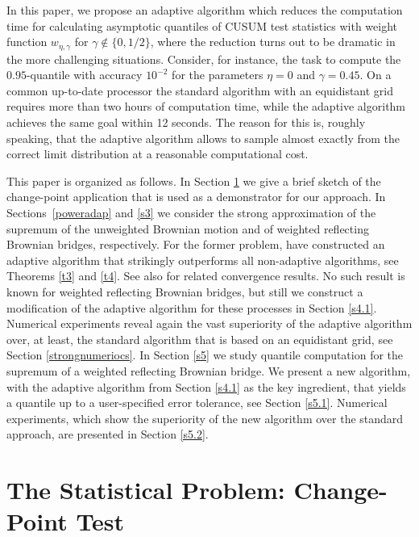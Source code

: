 \documentclass[a4paper]{amsart}
\theoremstyle{definition}
\theoremstyle{plain}
\begin{document}
In this paper, we propose an adaptive algorithm which
reduces the computation time for calculating asymptotic quantiles of
CUSUM test statistics with weight function $w_{\eta,\gamma}$ for
$\gamma \not\in \{0,1/2\}$, where the reduction turns out to be
dramatic in the more challenging situations.
Consider, for instance, the task to compute the
$0.95$-quantile with accuracy $10^{-2}$ for the parameters
$\eta=0$ and $\gamma = 0.45$. On a common up-to-date processor
the standard algorithm with an equidistant grid requires more than
two hours of computation time, while
the adaptive algorithm achieves the same goal within 12 seconds.
The reason for this is, roughly speaking, that
the adaptive algorithm allows
to sample almost exactly from the correct limit distribution
at a reasonable computational cost.

This paper is organized as follows.
In Section \ref{sec:CPT} we give a brief sketch of the change-point
application that is used as a demonstrator for our approach.
In Sections~\ref{poweradap} and \ref{s3} we consider
the strong approximation of the supremum of the
unweighted Brownian motion and of weighted reflecting
Brownian bridges, respectively.
For the former problem, \citet*{MR3605752} have constructed an adaptive
algorithm that strikingly outperforms all non-adaptive algorithms,
see Theorems \ref{t3} and \ref{t4}.
See also \citet*{Calvin1997,Calvin2001,Calvin2004} for related
convergence results.
No such result is known for weighted reflecting
Brownian bridges, but still we construct a
modification of the adaptive algorithm
for these processes in Section \ref{s4.1}. Numerical experiments reveal
again the vast superiority of the adaptive algorithm over, at least, the
standard algorithm that is based on an equidistant
grid, see Section \ref{strongnumeriocs}.
In Section \ref{s5} we study quantile computation
for the supremum of a weighted reflecting
Brownian bridge. We present a new algorithm, with
the adaptive algorithm from Section \ref{s4.1} as the key
ingredient, that yields a quantile up to a user-specified error tolerance,
see Section \ref{s5.1}. Numerical experiments, which show
the superiority of the new algorithm over the standard
approach, are presented in Section \ref{s5.2}.

\section{The Statistical Problem: Change-Point Test}\label{sec:CPT}
\end{document}
